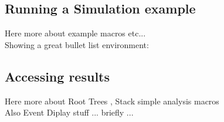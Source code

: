 \subsection{ Running a Simulation example}

Here more about example macros etc... \\

Showing a great bullet list environment:

\subsection{Accessing results}

Here more about Root Trees , Stack simple analysis macros \\
Also Event Diplay stuff ... briefly ...

